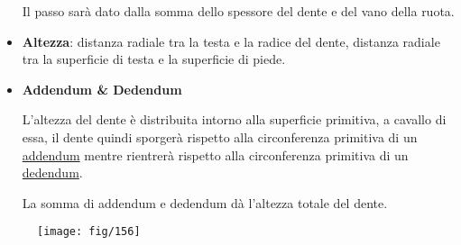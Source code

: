 \documentclass[a4paper, 15pt]{article}
\begin{document}
\begin{adjustwidth}{2in}{}
\begin{itemize}
		Il passo sarà dato dalla somma dello spessore del dente e del vano della ruota.
		
		\item \textbf{Altezza}: distanza radiale tra la testa e la radice del dente, distanza radiale tra la superficie di testa e la superficie di piede.
		
		\item \textbf{Addendum \& Dedendum}
		
		L'altezza del dente è distribuita intorno alla superficie primitiva, a cavallo di essa, il dente quindi sporgerà rispetto alla circonferenza primitiva di un \underline{addendum} mentre rientrerà rispetto alla circonferenza primitiva di un \underline{dedendum}.
		
		La somma di addendum e dedendum dà l'altezza totale del dente.		
	\end{itemize}
\end{adjustwidth}
	\begin{figure}[H]
		\centering
		\texttt{[image: fig/156]}
		\caption{}
		\label{fig:156}
	\end{figure}
	
\newpage
\end{document}
